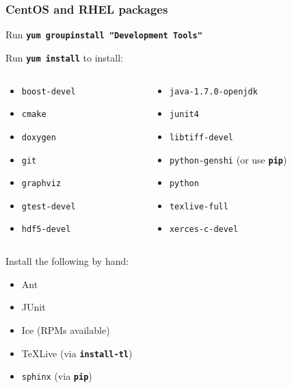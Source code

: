 \documentclass{beamer}
\newcommand{\cmd}[1]{\textbf{\texttt{#1}}}
\newcommand{\pkg}[1]{\texttt{#1}}
\begin{document}
\begin{frame}
  \frametitle{CentOS and RHEL packages}
  \scriptsize
  Run \cmd{yum groupinstall "Development Tools"}
  \bigskip

  Run \cmd{yum install} to install:
  \begin{columns}
    \begin{column}{.5\linewidth}
      \begin{itemize}
      \item[] \pkg{boost-devel}
      \item[] \pkg{cmake}
      \item[] \pkg{doxygen}
      \item[] \pkg{git}
      \item[] \pkg{graphviz}
      \item[] \pkg{gtest-devel}
      \item[] \pkg{hdf5-devel}
      \end{itemize}
    \end{column}
    \begin{column}{.5\linewidth}
      \begin{itemize}
      \item[] \pkg{java-1.7.0-openjdk}
      \item[] \pkg{junit4}
      \item[] \pkg{libtiff-devel}
      \item[] \pkg{python-genshi} (or use \cmd{pip})
      \item[] \pkg{python}
      \item[] \pkg{texlive-full}
      \item[] \pkg{xerces-c-devel}
      \end{itemize}
    \end{column}
  \end{columns}

  \bigskip
  Install the following by hand:

  \begin{itemize}
  \item Ant
  \item JUnit
  \item Ice (RPMs available)
  \item \TeX{}Live (via \cmd{install-tl})
  \item \pkg{sphinx} (via \cmd{pip})
\end{itemize}
\end{frame}
\end{document}
